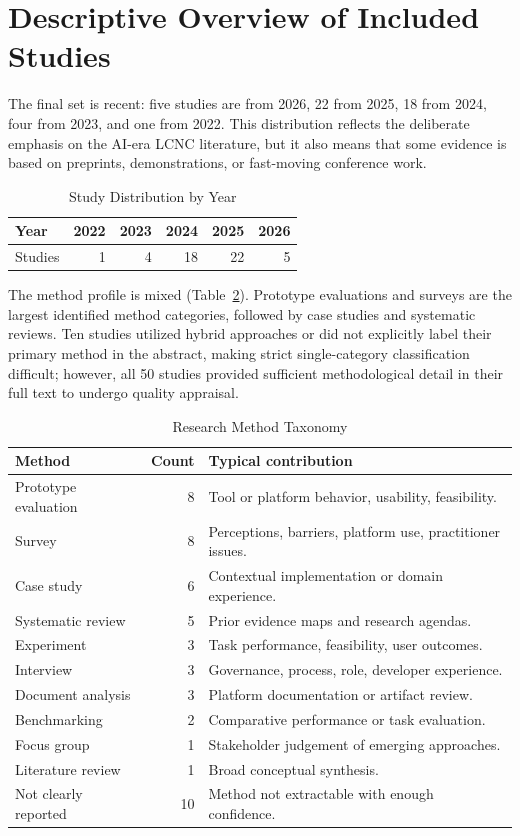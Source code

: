 \documentclass[conference]{IEEEtran}
\begin{document}
\section{Descriptive Overview of Included Studies}
The final set is recent: five studies are from 2026, 22 from 2025, 18 from 2024, four from 2023, and one from 2022. This distribution reflects the deliberate emphasis on the AI-era LCNC literature, but it also means that some evidence is based on preprints, demonstrations, or fast-moving conference work.

\begin{table}[t]
\centering
\caption{Study Distribution by Year}
\label{tab:years}
\scriptsize
\begin{tabular}{lrrrrr}
\toprule
Year & 2022 & 2023 & 2024 & 2025 & 2026 \\
\midrule
Studies & 1 & 4 & 18 & 22 & 5 \\
\bottomrule
\end{tabular}
\end{table}

The method profile is mixed (Table~\ref{tab:methods}). Prototype evaluations and surveys are the largest identified method categories, followed by case studies and systematic reviews. Ten studies utilized hybrid approaches or did not explicitly label their primary method in the abstract, making strict single-category classification difficult; however, all 50 studies provided sufficient methodological detail in their full text to undergo quality appraisal.

\begin{table}[t]
\centering
\caption{Research Method Taxonomy}
\label{tab:methods}
\scriptsize
\begin{tabularx}{\columnwidth}{l r X}
\toprule
Method & Count & Typical contribution \\
\midrule
Prototype evaluation & 8 & Tool or platform behavior, usability, feasibility. \\
Survey & 8 & Perceptions, barriers, platform use, practitioner issues. \\
Case study & 6 & Contextual implementation or domain experience. \\
Systematic review & 5 & Prior evidence maps and research agendas. \\
Experiment & 3 & Task performance, feasibility, user outcomes. \\
Interview & 3 & Governance, process, role, developer experience. \\
Document analysis & 3 & Platform documentation or artifact review. \\
Benchmarking & 2 & Comparative performance or task evaluation. \\
Focus group & 1 & Stakeholder judgement of emerging approaches. \\
Literature review & 1 & Broad conceptual synthesis. \\
Not clearly reported & 10 & Method not extractable with enough confidence. \\
\bottomrule
\end{tabularx}
\end{table}
\end{document}
